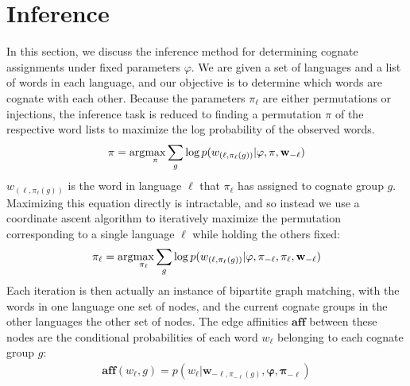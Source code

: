 \documentclass[11pt,a4paper]{article}
\begin{document}
\section{Inference}
In this section, we discuss the inference method for determining
cognate assignments under fixed parameters $\varphi$.  We are given a
set of languages and a list of words in each language, and our
objective is to determine which words are cognate with each other.
Because the parameters $\pi_\ell$ are either permutations or injections,
the inference task is reduced to finding a permutation $\pi$ of the
respective word lists to maximize the log probability of the observed
words.
\begin{equation*}
  \begin{split}
    \mathbf{\pi} = \arg\negthinspace\max_{\mathbf \pi} \sum_{g} \log p(w_{(\ell,\pi_\ell(g))}|\mathbf \varphi,\mathbf \pi, \mathbf{w}_{-\ell})
   \end{split}
 \end{equation*}
$w_{(\ell,\pi_\ell(g))}$ is the word in language $\ell$ that
$\pi_\ell$ has assigned to cognate group $g$. Maximizing this equation
directly is intractable, and so instead we use a coordinate ascent
algorithm to iteratively maximize the permutation corresponding to
a single language $\ell$ while holding the others fixed:
\begin{equation*}
  \begin{split}
    \pi_\ell = \arg\negthinspace\max_{\pi_\ell} \sum_{g} \log p(w_{(\ell,\pi_\ell(g))}|\mathbf \varphi,\mathbf \pi_{-\ell},\pi_\ell, \mathbf{w}_{-\ell})
  \end{split}
\end{equation*}
Each iteration is then actually an instance of bipartite graph
matching, with the words in one language one set of nodes, and the
current cognate groups in the other languages the other set of
nodes. The edge affinities $\mathbf{aff}$ between these nodes are the conditional
probabilities of each word $w_\ell$ belonging to each cognate group $g$:
\begin{equation*}
  \begin{split}
    \mathbf{aff}(w_\ell,g) = p(w_\ell|\mathbf w_{-\ell,\pi_{-\ell}(g)},\mathbf \varphi,\mathbf\pi_{-\ell})
   \end{split}
 \end{equation*}
\end{document}
